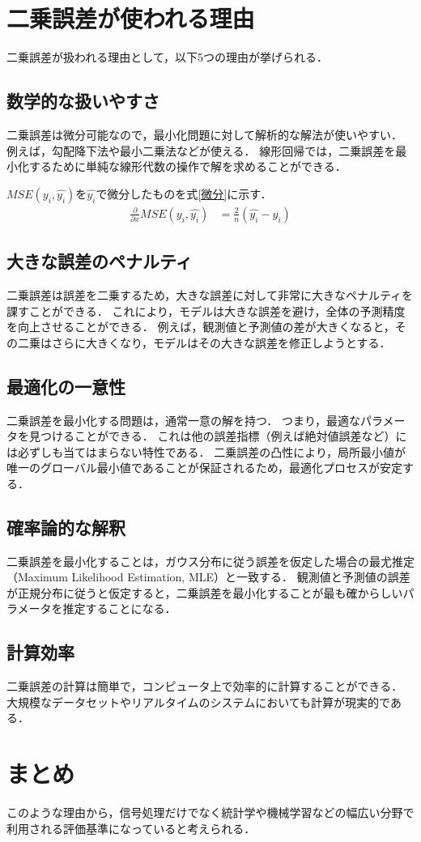 \documentclass[titlepage,a4paper]{jsarticle}
\begin{document}
\section*{二乗誤差が使われる理由}
二乗誤差が扱われる理由として，以下5つの理由が挙げられる．
\subsection{数学的な扱いやすさ}
二乗誤差は微分可能なので，最小化問題に対して解析的な解法が使いやすい．
例えば，勾配降下法や最小二乗法などが使える．
線形回帰では，二乗誤差を最小化するために単純な線形代数の操作で解を求めることができる．

$MSE(y_{i},\hat{y_{i}})$を$\hat{y_i}$で微分したものを式\eqref{微分}に示す．
\begin{align}
  \frac{\partial}{\partial x} MSE(y_{i},\hat{y_{i}}) & = \frac{2}{n}\left(\hat{y_i} - y_i\right)\label{微分}
\end{align}
\subsection{大きな誤差のペナルティ}
二乗誤差は誤差を二乗するため，大きな誤差に対して非常に大きなペナルティを課すことができる．
これにより，モデルは大きな誤差を避け，全体の予測精度を向上させることができる．
例えば，観測値と予測値の差が大きくなると，その二乗はさらに大きくなり，モデルはその大きな誤差を修正しようとする．
\subsection{最適化の一意性}
二乗誤差を最小化する問題は，通常一意の解を持つ．
つまり，最適なパラメータを見つけることができる．
これは他の誤差指標（例えば絶対値誤差など）には必ずしも当てはまらない特性である．
二乗誤差の凸性により，局所最小値が唯一のグローバル最小値であることが保証されるため，最適化プロセスが安定する．
\subsection{確率論的な解釈}
二乗誤差を最小化することは，ガウス分布に従う誤差を仮定した場合の最尤推定（Maximum Likelihood Estimation, MLE）と一致する．
観測値と予測値の誤差が正規分布に従うと仮定すると，二乗誤差を最小化することが最も確からしいパラメータを推定することになる．
\subsection{計算効率}
二乗誤差の計算は簡単で，コンピュータ上で効率的に計算することができる．
大規模なデータセットやリアルタイムのシステムにおいても計算が現実的である．

\section*{まとめ}
このような理由から，信号処理だけでなく統計学や機械学習などの幅広い分野で利用される評価基準になっていると考えられる．
\end{document}
